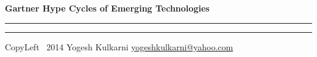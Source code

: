 
\graphicspath{{images/}}
\usepackage{beamerarticle} %



\begin{center}
     \Large{\textbf{Gartner Hype Cycles of Emerging Technologies}}  %
\end{center}
\rule{\linewidth}{0.25pt}
\raggedright
\footnotesize
\begin{multicols}{3}




\rule{0.3\linewidth}{0.25pt}

\scriptsize
CopyLeft \textcopyleft\ 2014 Yogesh Kulkarni
\href{http://www.yogeshkulkarni.com}{yogeshkulkarni@yahoo.com}

\end{multicols}


